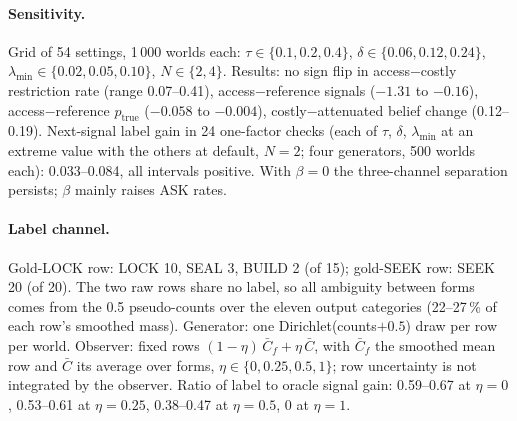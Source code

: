 \documentclass[runningheads]{llncs}
\newcommand{\Etrue}{p_{\mathrm{true}}}
\begin{document}
\paragraph{Sensitivity.} Grid of 54 settings, 1\,000 worlds each: $\tau\in\{0.1,0.2,0.4\}$, $\delta\in\{0.06,0.12,0.24\}$, $\lambda_{\min}\in\{0.02,0.05,0.10\}$, $N\in\{2,4\}$. Results: no sign flip in access$-$costly restriction rate (range 0.07--0.41), access$-$reference signals ($-1.31$ to $-0.16$), access$-$reference $\Etrue$ ($-0.058$ to $-0.004$), costly$-$attenuated belief change (0.12--0.19). Next-signal label gain in 24 one-factor checks (each of $\tau$, $\delta$, $\lambda_{\min}$ at an extreme value with the others at default, $N=2$; four generators, 500 worlds each): 0.033--0.084, all intervals positive. With $\beta=0$ the three-channel separation persists; $\beta$ mainly raises ASK rates.
\paragraph{Label channel.} Gold-LOCK row: LOCK 10, SEAL 3, BUILD 2 (of 15); gold-SEEK row: SEEK 20 (of 20). The two raw rows share no label, so all ambiguity between forms comes from the 0.5 pseudo-counts over the eleven output categories (22--27\,\% of each row's smoothed mass). Generator: one Dirichlet(counts$+0.5$) draw per row per world. Observer: fixed rows $(1-\eta)\,\bar C_f+\eta\,\bar C$, with $\bar C_f$ the smoothed mean row and $\bar C$ its average over forms, $\eta\in\{0,0.25,0.5,1\}$; row uncertainty is not integrated by the observer. Ratio of label to oracle signal gain: 0.59--0.67 at $\eta=0$, 0.53--0.61 at $\eta=0.25$, 0.38--0.47 at $\eta=0.5$, 0 at $\eta=1$.
\end{document}
